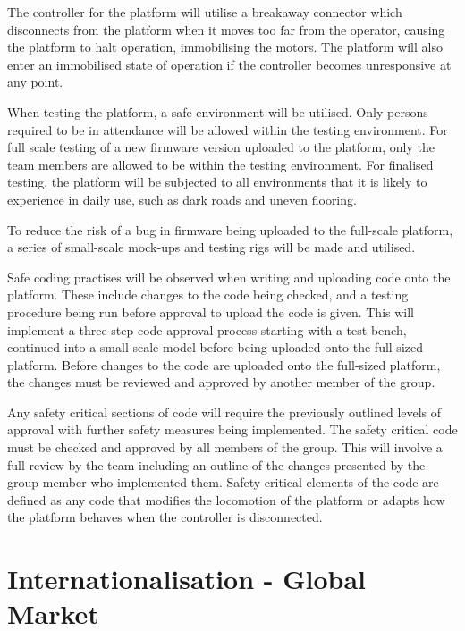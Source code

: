\documentclass [12pt]{article}
\begin{document}
The controller for the platform will utilise a breakaway connector which disconnects from the platform when it moves too far from the operator, causing the platform to halt operation, immobilising the motors.
The platform will also enter an immobilised state of operation if the controller becomes unresponsive at any point.


When testing the platform, a safe environment will be utilised. Only persons required to be in attendance will be allowed within the testing environment.
For full scale testing of a new firmware version uploaded to the platform, only the team members are allowed to be within the testing environment.
For finalised testing, the platform will be subjected to all environments that it is likely to experience in daily use, such as dark roads and uneven flooring.


To reduce the risk of a bug in firmware being uploaded to the full-scale platform, a series of small-scale mock-ups and testing rigs will be made and utilised.


Safe coding practises will be observed when writing and uploading code onto the platform.
These include changes to the code being checked, and a testing procedure being run before approval to upload the code is given.
This will implement a three-step code approval process starting with a test bench, continued into a small-scale model before being uploaded onto the full-sized platform.
Before changes to the code are uploaded onto the full-sized platform, the changes must be reviewed and approved by another member of the group.


Any safety critical sections of code will require the previously outlined levels of approval with further safety measures being implemented.
The safety critical code must be checked and approved by all members of the group.
This will involve a full review by the team including an outline of the changes presented by the group member who implemented them.
Safety critical elements of the code are defined as any code that modifies the locomotion of the platform or adapts how the platform behaves when the controller is disconnected.

\section{Internationalisation - Global Market}\label{sec:internationalisation}
\end{document}
